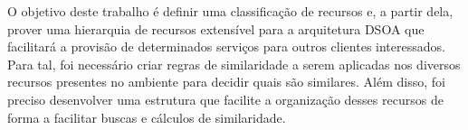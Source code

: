 O objetivo deste trabalho é definir uma classificação de recursos e, a partir dela, prover uma hierarquia de recursos extensível para a arquitetura DSOA que facilitará a provisão de determinados serviços para outros clientes interessados. Para tal, foi necessário criar regras de similaridade a serem aplicadas nos diversos recursos presentes no ambiente para decidir quais são similares. Além disso, foi preciso desenvolver uma estrutura que facilite a organização desses recursos de forma a facilitar buscas e cálculos de similaridade.

